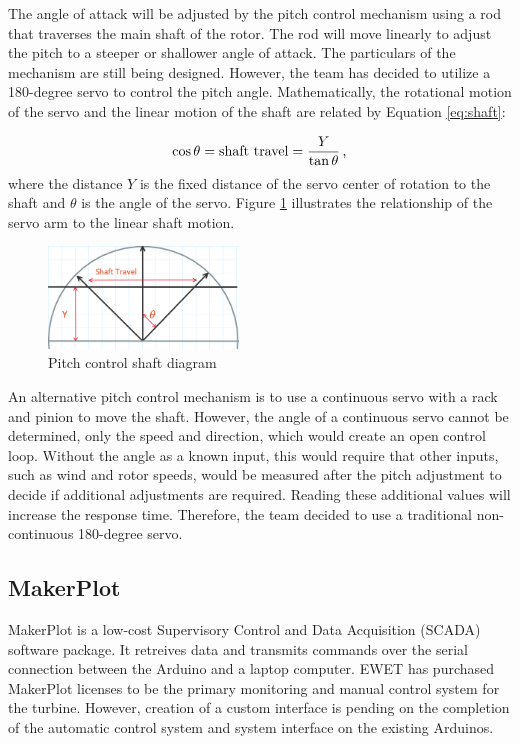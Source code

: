 \documentclass[11pt,letterpaper,conference]{IEEEtran}
\begin{document}
The angle of attack will be adjusted by the pitch control mechanism using a
rod that traverses the main shaft of the rotor. The rod will move linearly to
adjust the pitch to a steeper or shallower angle of attack. The particulars of
the mechanism are still being designed. However, the team has decided to
utilize a 180-degree servo to control the pitch angle. Mathematically, the
rotational motion of the servo and the linear motion of the shaft are related
by Equation \eqref{eq:shaft}:

\begin{equation}
    \label{eq:shaft}
    \cos\theta = \text{shaft travel} = \frac{Y}{\tan\theta}
    \text{\,,}
\end{equation}
where the distance $Y$ is the fixed distance of the servo center of rotation to
the shaft and $\theta$ is the angle of the servo.
Figure \ref{img:pitch_control} illustrates the relationship of the servo arm
to the linear shaft motion.

\begin{figure}[th]
    \centering
    \includegraphics[width=0.45\textwidth]{images/pitch_control.png}
    \caption{Pitch control shaft diagram}
    \label{img:pitch_control}
\end{figure}

An alternative pitch control mechanism is to use a continuous servo with a rack
and pinion to move the shaft. However, the angle of a continuous servo cannot
be determined, only the speed and direction, which would create an open control
loop. Without the angle as a known input, this would require that other inputs,
such as wind and rotor speeds, would be measured after the pitch adjustment to
decide if additional adjustments are required. Reading these additional values
will increase the response time. Therefore, the team decided to use a
traditional non-continuous 180-degree servo.

\subsection{MakerPlot}

MakerPlot is a low-cost Supervisory Control and Data Acquisition (SCADA)
software package\cite{makerplot}. It retreives data and transmits commands over
the serial connection between the Arduino and a laptop computer. EWET has
purchased MakerPlot licenses to be the primary monitoring and manual control
system for the turbine. However, creation of a custom interface is pending on
the completion of the automatic control system and system interface on the
existing Arduinos.
\end{document}
